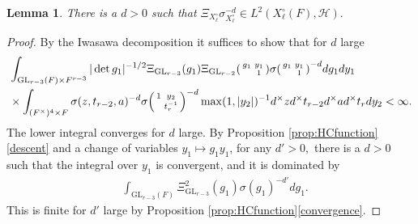 \documentclass[12pt]{amsart}
\newtheorem{lem}[thm]{Lemma}
\theoremstyle{remark}
\numberwithin{equation}{section}
\newcommand{\GL}{\mathrm{GL}}
\theoremstyle{definition}
\newenvironment{psmatrix}
  {\left(\begin{smallmatrix}}
  {\end{smallmatrix}\right)}
\numberwithin{equation}{subsection}
\begin{document}
\begin{lem} \label{lem:Xi:bound}
There is a $d>0$ such that $\Xi_{X_\ell^\circ}\sigma_{X_\ell^\circ}^{-d} \in L^2(X_\ell^\circ(F),\mathcal{H}).$
\end{lem}
\begin{proof}
By the Iwasawa decomposition it suffices to show that for $d$ large
\begin{align*}
&\int_{\GL_{r-3}(F)\times F^{r-3}} |\det g_1|^{-1/2}\Xi_{\GL_{r-3}}(g_1)\Xi_{\GL_{r-2}}\begin{psmatrix}
    g_1 & y_1 \\
    & 1
\end{psmatrix}\sigma\begin{psmatrix} g_1 & y_1\\ & 1 \end{psmatrix}^{-d} dg_1 dy_1\\
&\times \int_{(F^\times)^4\times F} \sigma(z,t_{r-2},a)^{-d}\sigma\begin{psmatrix} 1 & y_2 \\
& t_{r}^{-1}\end{psmatrix}^{-d}\max(1,|y_2|)^{-1} d^\times z d^\times t_{r-2} d^\times a d^\times t_r dy_2<\infty.
\end{align*}
The lower integral converges for $d$ large. By Proposition \ref{prop:HCfunction}\ref{descent} and a change of variables $y_1\mapsto g_1y_1$, for any $d'>0,$ there is a $d>0$ such that the integral over $y_1$ is convergent, and it is dominated by
\begin{align*}
&\int_{\GL_{r-3}(F)} \Xi_{\GL_{r-3}}^2(g_1)\sigma(g_1)^{-d'}dg_1.
\end{align*}
This is finite for $d'$ large by  Proposition \ref{prop:HCfunction}\ref{convergence}. 
\end{proof}
\end{document}

